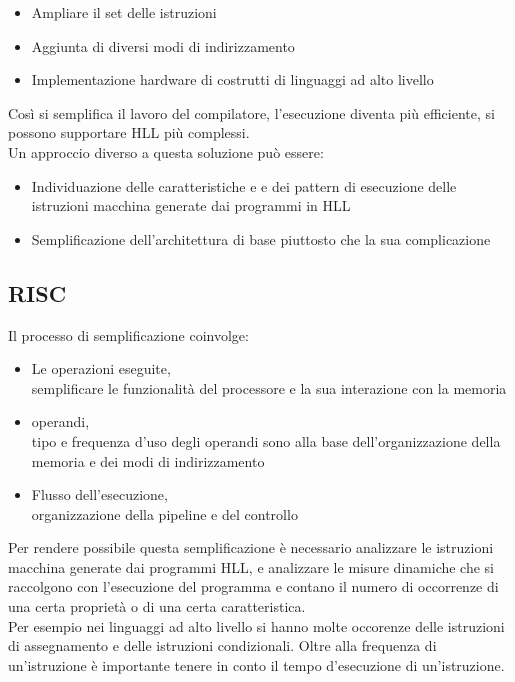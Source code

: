 \documentclass[arch.tex]{subfiles}
\begin{document}
\begin{itemize}
	\item Ampliare il set delle istruzioni
	\item Aggiunta di diversi modi di indirizzamento
	\item Implementazione hardware di costrutti di linguaggi ad alto livello
\end{itemize}

Così si semplifica il lavoro del compilatore, l'esecuzione diventa più efficiente, si possono
supportare HLL più complessi.\\
Un approccio diverso a questa soluzione può essere:

\begin{itemize}
	\item Individuazione delle caratteristiche e e dei pattern di esecuzione delle istruzioni
		macchina generate dai programmi in HLL
	\item Semplificazione dell'architettura di base piuttosto che la sua complicazione
\end{itemize}

\subsection{RISC}%
\label{sub:risc}

Il processo di semplificazione coinvolge:

\begin{itemize}
	\item Le operazioni eseguite,\\
		semplificare le funzionalità del processore e la sua interazione con la memoria
	\item operandi,\\
		tipo e frequenza d'uso degli operandi sono alla base dell'organizzazione
		della memoria e dei modi di indirizzamento
	\item Flusso dell'esecuzione,\\
		organizzazione della pipeline e del controllo
\end{itemize}
Per rendere possibile questa semplificazione è necessario analizzare le istruzioni macchina 
generate dai programmi HLL, e analizzare le misure dinamiche che si raccolgono con l'esecuzione
del programma e contano il numero di occorrenze di una certa proprietà o di una certa 
caratteristica.\\
Per esempio nei linguaggi ad alto livello si hanno molte occorenze delle istruzioni di 
assegnamento e delle istruzioni condizionali. Oltre alla frequenza di un'istruzione
è importante tenere in conto il tempo d'esecuzione di un'istruzione.\\
\end{document}

